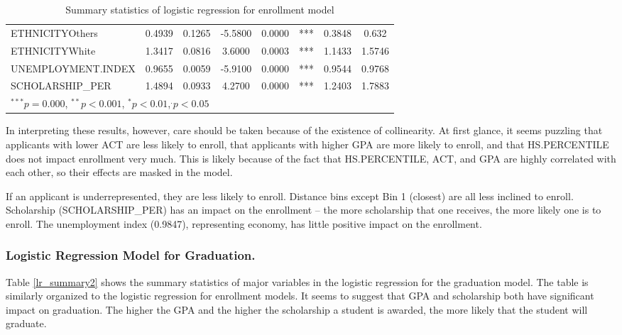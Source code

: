 \documentclass[12pt,english]{report}
\begin{document}
\begin{table}[H]
\begin{adjustbox}{width=0.95\textwidth}
\begin{tabular}{|lccclccc|}
ETHNICITYOthers                & 0.4939   & 0.1265     & -5.5800  & 0.0000    & ***         & 0.3848 & 0.632   \\
ETHNICITYWhite                  & 1.3417   & 0.0816     & 3.6000   & 0.0003    & ***         & 1.1433 & 1.5746  \\
UNEMPLOYMENT.INDEX              & 0.9655   & 0.0059     & -5.9100  & 0.0000    & ***         & 0.9544 & 0.9768  \\
SCHOLARSHIP\_PER                & 1.4894   & 0.0933     & 4.2700   & 0.0000    & ***         & 1.2403 & 1.7883  \\
\hline %
\multicolumn{7}{l}{\scriptsize{$^{***} p=0.000$, $^{**} p<0.001$, $^*p<0.01$,$^{.}p<0.05$}}
\end{tabular}
\end{adjustbox}
\caption{Summary statistics of logistic regression for enrollment model}
\label{lr_summary}
\end{table}

In interpreting these results, however, care should be taken because of the existence of collinearity. At first glance, it seems puzzling that  applicants with lower ACT are less likely to enroll, that applicants with higher GPA are more likely to enroll, and that HS.PERCENTILE does not impact enrollment very much. This is likely because of the fact that HS.PERCENTILE, ACT, and GPA are highly correlated with each other, so their effects are masked in the model. 

If an applicant is underrepresented, they are  less likely to enroll. Distance bins except Bin 1 (closest) are all less inclined to  enroll. Scholarship (SCHOLARSHIP\_PER) has an impact on the  enrollment -- the more scholarship that one receives, the more likely one is to enroll.  The unemployment index (0.9847), representing economy, has  little positive impact on the enrollment.
  
\subsubsection{Logistic Regression Model for Graduation.}  
Table \ref{lr_summary2} shows the summary statistics of major variables in the logistic regression for the graduation model. The table is similarly organized to the logistic regression for enrollment models.  It seems to suggest that  GPA and scholarship both have significant impact on  graduation. The higher the GPA and the higher the scholarship a student is awarded, the more likely that the student will graduate. 
\end{document}
